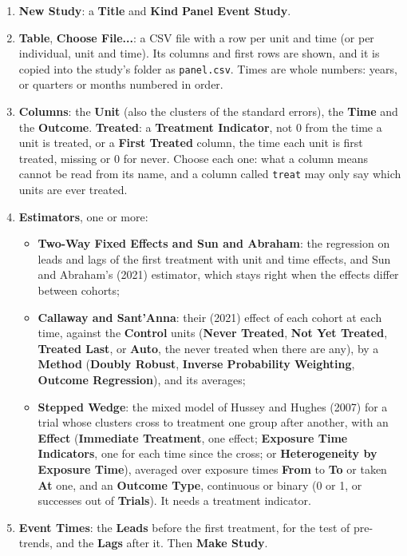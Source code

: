 \documentclass[10pt,a4paper,twoside]{article}
\newcommand{\ui}[1]{\textbf{#1}}
\begin{document}
\begin{enumerate}[label=\arabic*.]
  \item \ui{New Study}: a \ui{Title} and \ui{Kind} \ui{Panel Event Study}.
  \item \ui{Table}, \ui{Choose File...}: a CSV file with a row per unit and time (or per individual, unit and
    time). Its columns and first rows are shown, and it is copied into the study's folder as \texttt{panel.csv}.
    Times are whole numbers: years, or quarters or months numbered in order.
  \item \ui{Columns}: the \ui{Unit} (also the clusters of the standard errors), the \ui{Time} and the
    \ui{Outcome}. \ui{Treated}: a \ui{Treatment Indicator}, not 0 from the time a unit is treated, or a
    \ui{First Treated} column, the time each unit is first treated, missing or 0 for never. Choose each one:
    what a column means cannot be read from its name, and a column called \texttt{treat} may only say which
    units are ever treated.
  \item \ui{Estimators}, one or more:
    \begin{itemize}
      \item \ui{Two-Way Fixed Effects and Sun and Abraham}: the regression on leads and lags of the first treatment
        with unit and time effects, and Sun and Abraham's (2021) estimator, which stays right when the effects
        differ between cohorts;
      \item \ui{Callaway and Sant'Anna}: their (2021) effect of each cohort at each time, against the
        \ui{Control} units (\ui{Never Treated}, \ui{Not Yet Treated}, \ui{Treated Last}, or \ui{Auto}, the never
        treated when there are any), by a \ui{Method} (\ui{Doubly Robust}, \ui{Inverse Probability Weighting},
        \ui{Outcome Regression}), and its averages;
      \item \ui{Stepped Wedge}: the mixed model of Hussey and Hughes (2007) for a trial whose clusters cross to
        treatment one group after another, with an \ui{Effect} (\ui{Immediate Treatment}, one effect;
        \ui{Exposure Time Indicators}, one for each time since the cross; or \ui{Heterogeneity by Exposure Time}),
        averaged over exposure times \ui{From} to \ui{To} or taken \ui{At} one, and an \ui{Outcome Type},
        continuous or binary (0 or 1, or successes out of \ui{Trials}). It needs a treatment indicator.
    \end{itemize}
  \item \ui{Event Times}: the \ui{Leads} before the first treatment, for the test of pre-trends, and the
    \ui{Lags} after it. Then \ui{Make Study}.
\end{enumerate}
\end{document}
